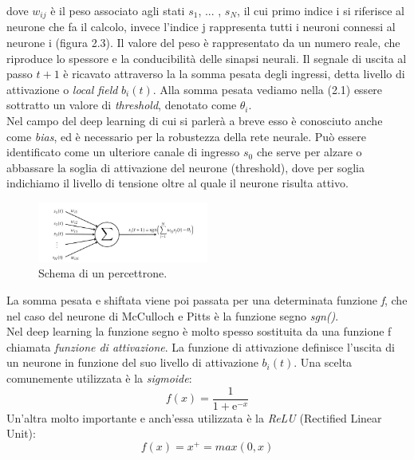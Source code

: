 dove \(w_{ij}\) è il peso associato agli stati \(s_1\), ... , \(s_N\), il cui primo indice i si riferisce al neurone che fa il calcolo,
invece l’indice j rappresenta tutti 
i neuroni connessi al neurone i (figura 2.3). Il valore del peso è rappresentato da un numero reale, 
che riproduce lo spessore e la conducibilità delle sinapsi neurali.
 Il segnale di uscita al passo \(t+1\) è ricavato attraverso la la somma pesata degli ingressi, 
detta livello di attivazione o \emph{local field} \(b_i(t)\). 
Alla somma pesata vediamo nella (2.1) essere sottratto un valore di \emph{threshold}, 
denotato come \(\theta_i\). \\
Nel campo del deep learning di cui si parlerà a breve esso è conosciuto 
anche come \emph{bias}, ed è necessario per la robustezza della rete neurale. 
Può essere identificato
 come un ulteriore canale di ingresso \(s_0\) che serve per alzare o 
abbassare la soglia di attivazione del neurone (threshold), dove per soglia
 indichiamo il livello di tensione oltre
 al quale il neurone risulta attivo. \\
 \begin{figure}[hb!]
  \centering
  \includegraphics[width=0.5\textwidth]{Figures/neuron.PNG}
  \caption{\small{Schema di un percettrone. ~\cite{reti}
   } %
  } %
  \label{fi:dcalc}
\end{figure}
La somma pesata e shiftata viene poi passata per una determinata funzione \emph{f}, 
che nel caso del neurone di McCulloch e Pitts  è la funzione segno \emph{sgn()}.\\
Nel deep learning la funzione segno è molto spesso sostituita da una funzione f chiamata
 \emph{funzione di attivazione}. La funzione di attivazione definisce l’uscita di un neurone 
 in funzione del suo livello di attivazione \(b_i(t)\).
Una scelta comunemente utilizzata è la \emph{sigmoide}: 
\[f(x)= \frac{1}{1+\mathrm{e}^{-x}}\]
Un’altra molto importante e anch’essa utilizzata è la \emph{ReLU} (Rectified Linear Unit):
\[f(x) = x^{+} = max(0,x)\]

